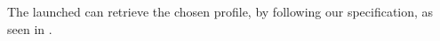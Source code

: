 The launched \girafapp[] can retrieve the chosen profile, by following our specification, as seen in .


